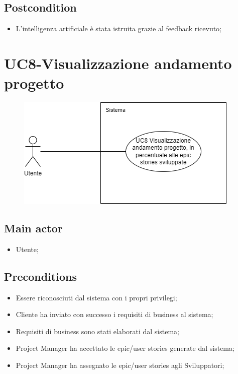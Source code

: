 \documentclass{article}
\begin{document}
        \subsection*{Postcondition} 
        \begin{itemize}
            \item L'intelligenza artificiale è stata istruita grazie al feedback ricevuto;
        \end{itemize}

\section{UC8-Visualizzazione andamento progetto}
    \begin{figure}[h]
      \centering
      \includegraphics{documenti/imgUML/UC8.png}
      \label{fig:immagine}
    \end{figure}
    
    \subsection*{Main actor}
        \begin{itemize}
            \item Utente; 
        \end{itemize}
        
    \subsection*{Preconditions}
        \begin{itemize}
            \item Essere riconosciuti dal sistema con i propri privilegi;
            \item Cliente ha inviato con successo i requisiti di business al sistema;
            \item Requisiti di business sono stati elaborati dal sistema;
            \item Project Manager ha accettato le epic/user stories generate dal sistema;
            \item Project Manager ha assegnato le epic/user stories agli Sviluppatori;
        \end{itemize}
        
\end{document}
